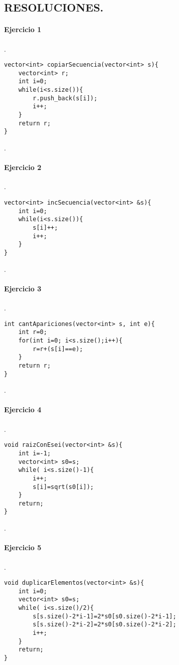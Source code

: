 \documentclass{article}
\begin{document}
\renewcommand{\thelstlisting}{\thesection.\arabic{lstlisting}}



\begin{center}
\section*{RESOLUCIONES.}
\end{center}
\paragraph{Ejercicio 1}.

\begin{lstlisting}
vector<int> copiarSecuencia(vector<int> s){
	vector<int> r;
	int i=0;
	while(i<s.size()){
		r.push_back(s[i]);
		i++;	
	}
	return r;
}
\end{lstlisting}
.
\paragraph*{Ejercicio 2}.

\begin{lstlisting}
vector<int> incSecuencia(vector<int> &s){
	int i=0;
	while(i<s.size()){
		s[i]++;
		i++;	
	}
}
\end{lstlisting}
.
\paragraph*{Ejercicio 3}.

\begin{lstlisting}
int cantApariciones(vector<int> s, int e){
	int r=0;
	for(int i=0; i<s.size();i++){
		r=r+(s[i]==e);
	}
	return r;
}
\end{lstlisting}
.
\paragraph*{Ejercicio 4}.

\begin{lstlisting}
void raizConEsei(vector<int> &s){
	int i=-1;
	vector<int> s0=s;
	while( i<s.size()-1){
		i++;
		s[i]=sqrt(s0[i]);
	}
	return;
}
\end{lstlisting}
.
\paragraph*{Ejercicio 5}.

\begin{lstlisting}
void duplicarElementos(vector<int> &s){
	int i=0;
	vector<int> s0=s;
	while( i<s.size()/2){
		s[s.size()-2*i-1]=2*s0[s0.size()-2*i-1];
		s[s.size()-2*i-2]=2*s0[s0.size()-2*i-2];
		i++;
	}
	return;
}
\end{lstlisting}
\end{document}
